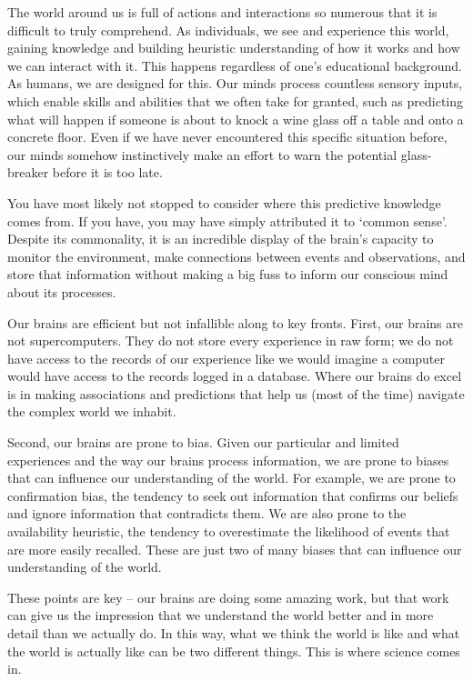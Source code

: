 \documentclass[
  letterpaper,
]{latex/krantz}
\theoremstyle{definition}
\theoremstyle{remark}
\begin{document}
The world around us is full of actions and interactions so numerous that
it is difficult to truly comprehend. As individuals, we see and
experience this world, gaining knowledge and building heuristic
understanding of how it works and how we can interact with it. This
happens regardless of one's educational background. As humans, we are
designed for this. Our minds process countless sensory inputs, which
enable skills and abilities that we often take for granted, such as
predicting what will happen if someone is about to knock a wine glass
off a table and onto a concrete floor. Even if we have never encountered
this specific situation before, our minds somehow instinctively make an
effort to warn the potential glass-breaker before it is too late.

You have most likely not stopped to consider where this predictive
knowledge comes from. If you have, you may have simply attributed it to
`common sense'. Despite its commonality, it is an incredible display of
the brain's capacity to monitor the environment, make connections
between events and observations, and store that information without
making a big fuss to inform our conscious mind about its processes.

Our brains are efficient but not infallible along to key fronts. First,
our brains are not supercomputers. They do not store every experience in
raw form; we do not have access to the records of our experience like we
would imagine a computer would have access to the records logged in a
database. Where our brains do excel is in making associations and
predictions that help us (most of the time) navigate the complex world
we inhabit.

Second, our brains are prone to bias. Given our particular and limited
experiences and the way our brains process information, we are prone to
biases that can influence our understanding of the world. For example,
we are prone to confirmation bias, the tendency to seek out information
that confirms our beliefs and ignore information that contradicts them.
We are also prone to the availability heuristic, the tendency to
overestimate the likelihood of events that are more easily recalled.
These are just two of many biases that can influence our understanding
of the world.

These points are key -- our brains are doing some amazing work, but that
work can give us the impression that we understand the world better and
in more detail than we actually do. In this way, what we think the world
is like and what the world is actually like can be two different things.
This is where science comes in.
\end{document}
